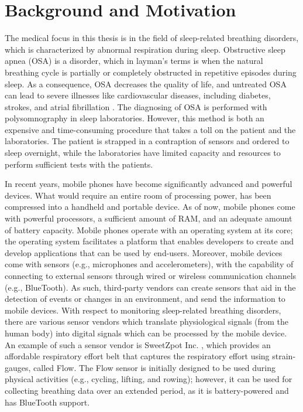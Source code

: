 \section{Background and Motivation}

The medical focus in this thesis is in the field of sleep-related breathing disorders, which is characterized by abnormal respiration during sleep. Obstructive sleep apnea (OSA) is a disorder, which in layman's terms is when the natural breathing cycle is partially or completely obstructed in repetitive episodes during sleep. As a consequence, OSA decreases the quality of life, and untreated OSA can lead to severe illnesses like cardiovascular diseases, including diabetes, strokes, and atrial fibrillation \cite{sleep_disorder}. The diagnosing of OSA is performed with polysomnography in sleep laboratories. However, this method is both an expensive and time-consuming procedure that takes a toll on the patient and the laboratories. The patient is strapped in a contraption of sensors and ordered to sleep overnight, while the laboratories have limited capacity and resources to perform sufficient tests with the patients.

In recent years, mobile phones have become significantly advanced and powerful devices. What would require an entire room of processing power, has been compressed into a handheld and portable device. As of now, mobile phones come with powerful processors, a sufficient amount of RAM, and an adequate amount of battery capacity. Mobile phones operate with an operating system at its core; the operating system facilitates a platform that enables developers to create and develop applications that can be used by end-users. Moreover, mobile devices come with sensors (e.g., microphones and accelerometers), with the capability of connecting to external sensors through wired or wireless communication channels (e.g., BlueTooth). As such, third-party vendors can create sensors that aid in the detection of events or changes in an environment, and send the information to mobile devices. With respect to monitoring sleep-related breathing disorders, there are various sensor vendors which translate physiological signals (from the human body) into digital signals which can be processed by the mobile device. An example of such a sensor vendor is SweetZpot Inc. \cite{flow}, which provides an affordable respiratory effort belt that captures the respiratory effort using strain-gauges, called Flow. The Flow sensor is initially designed to be used during physical activities (e.g., cycling, lifting, and rowing); however, it can be used for collecting breathing data over an extended period, as it is battery-powered and has BlueTooth support. 


